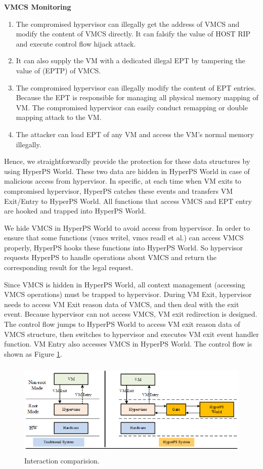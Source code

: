 \documentclass[10pt, numbers, preprint ]{sigplanconf}
\begin{document}
{\textbf{VMCS Monitoring}
\begin{enumerate}
	\item The compromised hypervisor can illegally get the address of VMCS and modify the content of VMCS directly. It can falsify the value of HOST RIP and execute control flow hijack attack.
	\item It can also supply the VM with a dedicated illegal EPT by tampering the value of (EPTP) of VMCS. 
	\item The compromised hypervisor can illegally modify the content of EPT entries. Because the EPT is responsible for managing all physical memory mapping of VM. The compromised hypervisor can easily conduct remapping or double mapping attack to the VM. 
	\item The attacker can load EPT of any VM and access the VM’s normal memory illegally.
\end{enumerate}

Hence, we straightforwardly provide the protection for these data structures by using HyperPS World. These two data are hidden in HyperPS World in case of malicious access from hypervisor. In specific, at each time when VM exits to compromised hypervisor, HyperPS catches these events and transfers VM Exit/Entry to HyperPS World. All functions that access VMCS and EPT entry are hooked and trapped into HyperPS World.

We hide VMCS in HyperPS World to avoid access from hypervisor. In order to ensure that some functions (vmcs writel, vmcs readl et al.) can access VMCS properly, HyperPS hooks these functions into HyperPS World. So hypervisor requests HyperPS to handle operations about VMCS and return the corresponding result for the legal request.

Since VMCS is hidden in HyperPS World, all context management (accessing VMCS operations) must be trapped to hypervisor. During VM Exit, hypervisor needs to access VM Exit reason data of VMCS, and then deal with the exit event. Because hypervisor can not access VMCS, VM exit redirection is designed. The control flow jumps to HyperPS World to access VM exit reason data of VMCS structure, then switches to hypervisor and executes VM exit event handler function. VM Entry also accesses VMCS in HyperPS World. The control flow is shown as Figure \ref{fg5_intr_compr}.

\begin{figure}[htbp]
	\centerline{\includegraphics[height=1.80in]{figures/p5.png}}
	\caption{Interaction comparision.}
	\label{fg5_intr_compr}
\end{figure}

}
\end{document}
